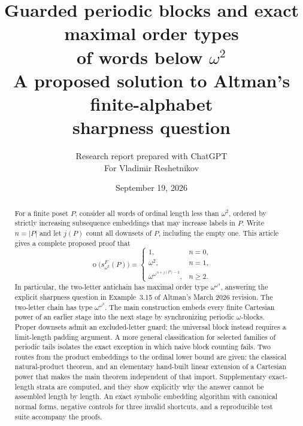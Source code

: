 \documentclass[11pt,a4paper]{article}
\title{\vspace{-10mm}\color{ink}\LARGE\bfseries
Guarded periodic blocks and exact maximal order types\\[2mm]
of words below $\omega^2$\\[3mm]
\large A proposed solution to Altman's finite-alphabet\\sharpness question}
\author{Research report prepared with ChatGPT\\
\small For Vladimir Reshetnikov}
\date{September 19, 2026}
\numberwithin{equation}{section}
\theoremstyle{definition}
\theoremstyle{remark}
\newcommand{\mot}{\mathop{o}}
\newcommand{\Wordspace}[1]{s_{\omega^2}^{F}(#1)}
\begin{document}
\maketitle
\thispagestyle{empty}
\begin{abstract}
For a finite poset $P$, consider all words of ordinal length less than
$\omega^2$, ordered by strictly increasing subsequence embeddings that may
increase labels in $P$. Write $n=|P|$ and let $j(P)$ count all downsets of
$P$, including the empty one. This article gives a complete proposed proof
that
\[
  \mot\bigl(\Wordspace P\bigr)=
  \begin{cases}
    1,&n=0,\\
    \omega^2,&n=1,\\
    \omega^{\omega^{\,n+j(P)-2}},&n\ge2.
  \end{cases}
\]
In particular, the two-letter antichain has maximal order type
$\omega^{\omega^4}$, answering the explicit sharpness question in
Example~3.15 of Altman's March 2026 revision. The two-letter chain has type
$\omega^{\omega^3}$. The main construction embeds every finite Cartesian
power of an earlier stage into the next stage by synchronizing periodic
$\omega$-blocks. Proper downsets admit an excluded-letter guard; the universal
block instead requires a limit-length padding argument. A more general
classification for selected families of periodic tails isolates the exact
exception in which naive block counting fails. Two routes from the product
embeddings to the ordinal lower bound are given: the classical natural-product
theorem, and an elementary hand-built linear extension of a Cartesian power
that makes the main theorem independent of that import. Supplementary
exact-length strata are computed, and they show explicitly why the answer
cannot be assembled length by length. An exact symbolic embedding algorithm
with canonical normal forms, negative controls for three invalid shortcuts,
and a reproducible test suite accompany the proofs.
\end{abstract}
\end{document}
